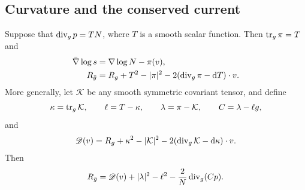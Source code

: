 \subsection{Curvature and the conserved current}

\begin{lemma}\label{lem:graph-curvature}
Suppose that $\operatorname{div}_g p=TN$, where $T$ is a smooth scalar function.
Then $\operatorname{tr}_g\pi=T$ and
\begin{align}
 \bar\nabla\log s&=\nabla\log N-\pi(v),
 \label{eq:calculus-lapse-differential}\\
 R_{\bar g}
 &=R_g+T^2-|\pi|^2-2(\operatorname{div}_g\pi-\mathop{}\!\mathrm d T)\cdot v.
 \label{eq:calculus-static-curvature}
\end{align}
More generally, let $\mathcal K$ be any smooth symmetric covariant tensor,
and define
\begin{equation}
 \kappa=\operatorname{tr}_g\mathcal K,\qquad
 \ell=T-\kappa,\qquad \lambda=\pi-\mathcal K,
 \qquad C=\lambda-\ell g,
 \label{eq:calculus-trace-definitions}
\end{equation}
and
\begin{equation}
 \mathscr D(v)=R_g+\kappa^2-|\mathcal K|^2
       -2(\operatorname{div}_g\mathcal K-\mathop{}\!\mathrm d\kappa)\cdot v.
 \label{eq:calculus-dominant-expression}
\end{equation}
Then
\begin{equation}
 R_{\bar g}=\mathscr D(v)+|\lambda|^2-\ell^2
                   -\frac2N\operatorname{div}_g(Cp).
 \label{eq:calculus-completed-curvature}
\end{equation}
\end{lemma}

